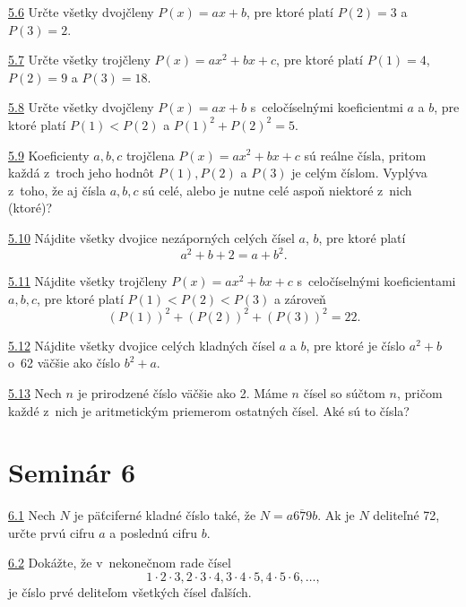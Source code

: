 \noindent \ul{5.6}  Určte všetky dvojčleny $P (x) = ax + b$, pre ktoré platí $P(2) = 3$ a $P (3) = 2$.




\noindent \ul{5.7}  Určte všetky trojčleny $P (x) = ax^2+ bx + c$, pre ktoré platí $P (1) = 4$, $P (2) = 9$ a $P (3) = 18$.




\noindent \ul{5.8}  Určte všetky dvojčleny $P (x) = ax+b$ s~celočíselnými koeficientmi $a$ a $b$, pre ktoré platí $P (1) < P (2)$ a $P (1)^2+ P(2)^2= 5$.




\noindent \ul{5.9}  Koeficienty $a, b, c$ trojčlena $P (x) = ax^2+ bx + c$ sú reálne čísla, pritom každá z~troch jeho hodnôt $P (1), P (2)$ a $P (3)$ je celým číslom. Vyplýva z~toho, že aj čísla $a, b, c$ sú celé, alebo je nutne celé aspoň niektoré z~nich (ktoré)?




\noindent \ul{5.10}  Nájdite všetky dvojice nezáporných celých čísel $a$, $b$, pre ktoré platí
$$a^2 + b + 2 = a + b^2.$$




\noindent \ul{5.11} 
Nájdite všetky trojčleny $P(x)=ax^2+bx+c$ s~celočíselnými koeficientami $a, b, c$, pre ktoré platí $P(1) < P(2) < P(3)$ a zároveň $$(P(1))^2+ (P(2))^2+ (P(3))^2= 22.$$



\noindent \ul{5.12} 
Nájdite všetky dvojice celých kladných čísel $a$ a $b$, pre ktoré je číslo $a^2 +b$ o~62 väčšie
ako číslo $b^2 + a$.




\noindent \ul{5.13}  Nech $n$ je prirodzené číslo väčšie ako 2. Máme $n$ čísel so súčtom $n$, pričom každé z~nich je aritmetickým priemerom ostatných čísel. Aké sú to čísla?




\section*{Seminár 6}

\noindent \ul{6.1}  Nech $N$ je päťciferné kladné číslo také, že $N=\overline{a679b}$. Ak je $N$ deliteľné 72, určte prvú cifru $a$ a poslednú cifru $b$.




\noindent \ul{6.2}  Dokážte, že v~nekonečnom rade čísel
$$ 1 \cdot 2 \cdot 3, 2 \cdot 3 \cdot 4, 3 \cdot 4 \cdot 5, 4 \cdot 5 \cdot 6, \ldots ,$$
je číslo prvé deliteľom všetkých čísel ďalších.





